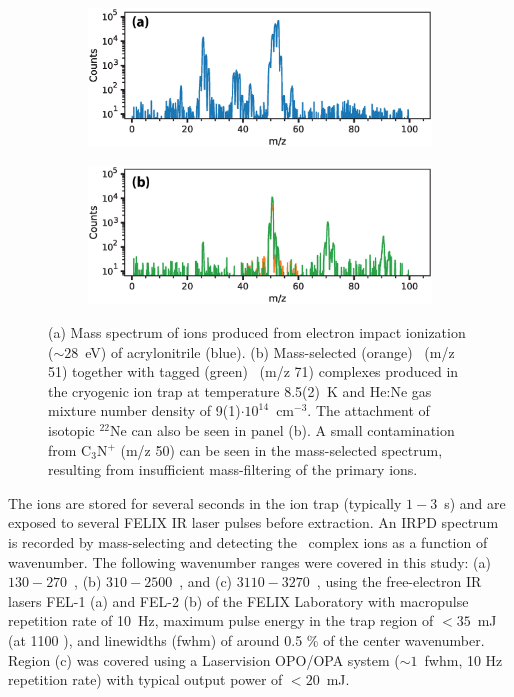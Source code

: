 \begin{figure}[tb]
    \centering
     \begin{subfigure}[b]{0.48\textwidth}
         \centering
         \includegraphics[width=1\textwidth]{chapters/HC3N+/figures/masspec/modified/HC3N+_masspec.eps}
         \label{fig:HC3N+masspec:background}
     \end{subfigure}
     \hfill
     \begin{subfigure}[b]{0.49\textwidth}
         \centering
         \includegraphics[width=1\textwidth]{chapters/HC3N+/figures/masspec/modified/HC3N+_masspec_complex.eps}
         \label{fig:HC3N+masspec:complex}
     \end{subfigure}
    \caption{(a) Mass spectrum of ions produced from electron impact ionization ($\sim 28$~eV) of acrylonitrile (blue). (b) Mass-selected (orange) \ion\ (m/z  51) together with tagged (green) \neion\ (m/z  71) complexes produced in the cryogenic ion trap at temperature 8.5(2)~K and He:Ne gas mixture number density of 9(1)$\cdot 10^{14}$~cm$^{-3}$. The attachment of isotopic $^{22}$Ne can also be seen in panel (b).  A small contamination from C$_3$N$^+$ (m/z 50) can be seen in the mass-selected spectrum, resulting from insufficient mass-filtering of the primary ions.}
    \label{fig:HC3N+masspec}
\end{figure}

The ions are stored for several seconds in the ion trap (typically $1-3$~s) and are exposed to several FELIX IR laser pulses before extraction. An IRPD spectrum is recorded by mass-selecting and detecting the \neion\ complex ions as a function of wavenumber. The following wavenumber ranges were covered in this study: (a) $130 - 270$~\wn, (b) $310 - 2500$~\wns, and (c) $3110 - 3270$~\wn, using the free-electron IR lasers FEL-1 (a) and FEL-2 (b) of the FELIX Laboratory with macropulse repetition rate of 10~Hz, maximum pulse energy in the trap region of $< 35$~mJ (at 1100 \wn), and linewidths (fwhm) of around 0.5 \% of the center wavenumber.  Region (c) was covered using a Laservision OPO/OPA system ($\sim 1$~\wns  fwhm, 10 Hz repetition rate) with typical output power of $<20$~mJ. 

